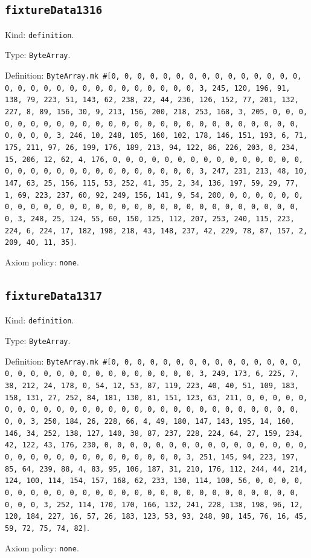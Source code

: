 \documentclass[11pt]{article}
\begin{document}
\subsection*{\texttt{fixtureData1316}}
\noindent Kind: \texttt{definition}.\par
\noindent Type: \texttt{ByteArray}.\par
\noindent Definition: \texttt{ByteArray.mk \#[0, 0, 0, 0, 0, 0, 0, 0, 0, 0, 0, 0, 0, 0, 0, 0, 0, 0, 0, 0, 0, 0, 0, 0, 0, 0, 0, 0, 0, 0, 3, 245, 120, 196, 91, 138, 79, 223, 51, 143, 62, 238, 22, 44, 236, 126, 152, 77, 201, 132, 227, 8, 89, 156, 30, 9, 213, 156, 200, 218, 253, 168, 3, 205, 0, 0, 0, 0, 0, 0, 0, 0, 0, 0, 0, 0, 0, 0, 0, 0, 0, 0, 0, 0, 0, 0, 0, 0, 0, 0, 0, 0, 0, 0, 3, 246, 10, 248, 105, 160, 102, 178, 146, 151, 193, 6, 71, 175, 211, 97, 26, 199, 176, 189, 213, 94, 122, 86, 226, 203, 8, 234, 15, 206, 12, 62, 4, 176, 0, 0, 0, 0, 0, 0, 0, 0, 0, 0, 0, 0, 0, 0, 0, 0, 0, 0, 0, 0, 0, 0, 0, 0, 0, 0, 0, 0, 0, 0, 3, 247, 231, 213, 48, 10, 147, 63, 25, 156, 115, 53, 252, 41, 35, 2, 34, 136, 197, 59, 29, 77, 1, 69, 223, 237, 60, 92, 249, 156, 141, 9, 54, 200, 0, 0, 0, 0, 0, 0, 0, 0, 0, 0, 0, 0, 0, 0, 0, 0, 0, 0, 0, 0, 0, 0, 0, 0, 0, 0, 0, 0, 0, 0, 3, 248, 25, 124, 55, 60, 150, 125, 112, 207, 253, 240, 115, 223, 224, 6, 224, 17, 182, 198, 218, 43, 148, 237, 42, 229, 78, 87, 157, 2, 209, 40, 11, 35]}.\par
\noindent Axiom policy: \texttt{none}.\par
\subsection*{\texttt{fixtureData1317}}
\noindent Kind: \texttt{definition}.\par
\noindent Type: \texttt{ByteArray}.\par
\noindent Definition: \texttt{ByteArray.mk \#[0, 0, 0, 0, 0, 0, 0, 0, 0, 0, 0, 0, 0, 0, 0, 0, 0, 0, 0, 0, 0, 0, 0, 0, 0, 0, 0, 0, 0, 0, 3, 249, 173, 6, 225, 7, 38, 212, 24, 178, 0, 54, 12, 53, 87, 119, 223, 40, 40, 51, 109, 183, 158, 131, 27, 252, 84, 181, 130, 81, 151, 123, 63, 211, 0, 0, 0, 0, 0, 0, 0, 0, 0, 0, 0, 0, 0, 0, 0, 0, 0, 0, 0, 0, 0, 0, 0, 0, 0, 0, 0, 0, 0, 0, 3, 250, 184, 26, 228, 66, 4, 49, 180, 147, 143, 195, 14, 160, 146, 34, 252, 138, 127, 140, 38, 87, 237, 228, 224, 64, 27, 159, 234, 42, 122, 43, 176, 230, 0, 0, 0, 0, 0, 0, 0, 0, 0, 0, 0, 0, 0, 0, 0, 0, 0, 0, 0, 0, 0, 0, 0, 0, 0, 0, 0, 0, 0, 0, 3, 251, 145, 94, 223, 197, 85, 64, 239, 88, 4, 83, 95, 106, 187, 31, 210, 176, 112, 244, 44, 214, 124, 100, 114, 154, 157, 168, 62, 233, 130, 114, 100, 56, 0, 0, 0, 0, 0, 0, 0, 0, 0, 0, 0, 0, 0, 0, 0, 0, 0, 0, 0, 0, 0, 0, 0, 0, 0, 0, 0, 0, 0, 0, 3, 252, 114, 170, 170, 166, 132, 241, 228, 138, 198, 96, 12, 120, 184, 227, 16, 57, 26, 183, 123, 53, 93, 248, 98, 145, 76, 16, 45, 59, 72, 75, 74, 82]}.\par
\noindent Axiom policy: \texttt{none}.\par
\end{document}
